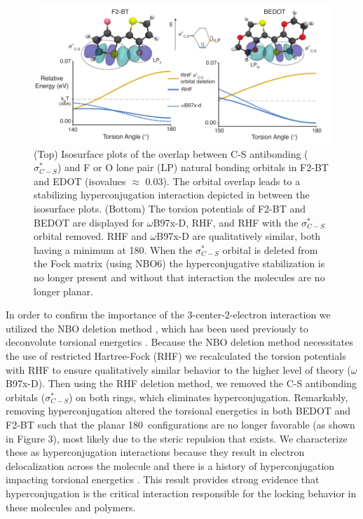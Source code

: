 \begin{figure}[hbt!]
    \centering
    \includegraphics{figures/chap3/fig3_d3.pdf}
    \caption[F2-BT and BEDOT Torsional Energetics with and without Hyperconjugation Removed]{(Top) Isosurface plots of the overlap between C-S antibonding ($\sigma^{*}_{C-S}$) and F or O lone pair (LP) natural bonding orbitals in F2-BT and EDOT (isovalues $\approx$ 0.03). The orbital overlap leads to a stabilizing hyperconjugation interaction depicted in between the isosurface plots. (Bottom) The torsion potentials of F2-BT and BEDOT are displayed for $\omega$B97x-D, RHF, and RHF with the $\sigma^{*}_{C-S}$ orbital removed. RHF and $\omega$B97x-D are qualitatively similar, both having a minimum at 180\textdegree. When the $\sigma^{*}_{C-S}$ orbital is deleted from the Fock matrix (using NBO6) the hyperconjugative stabilization is no longer present and without that interaction the molecules are no longer planar.}
    \label{fig:nbo_del}
\end{figure}

In order to confirm the importance of the 3-center-2-electron interaction we utilized the NBO deletion method \cite{NBO6}, which has been used previously to deconvolute torsional energetics \cite{Pophristic2001}. Because the NBO deletion method necessitates the use of restricted Hartree-Fock (RHF) we recalculated the torsion potentials with RHF to ensure qualitatively similar behavior to the higher level of theory ($\omega$B97x-D). Then using the RHF deletion method, we removed the C-S antibonding orbitals ($\sigma^{*}_{C-S}$) on both rings, which eliminates hyperconjugation. Remarkably, removing hyperconjugation altered the torsional energetics in both BEDOT and F2-BT such that the planar 180\textdegree \ configurations are no longer favorable (as shown in Figure 3), most likely due to the steric repulsion that exists. We characterize these as hyperconjugation interactions because they result in electron delocalization across the molecule and there is a history of hyperconjugation impacting torsional energetics \cite{Pophristic2001, R.Rablen1999}. This result provides strong evidence that hyperconjugation is the critical interaction responsible for the locking behavior in these molecules and polymers.

